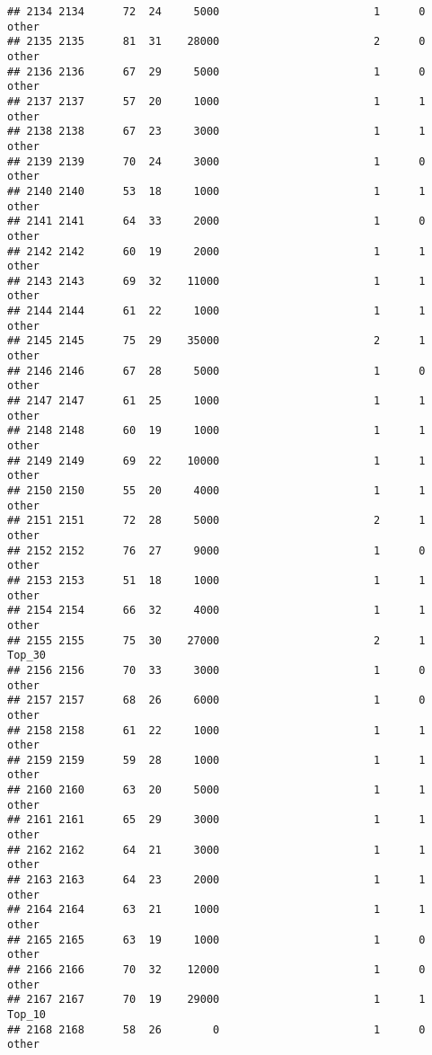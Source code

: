 \documentclass[
]{article}
\begin{document}
\begin{verbatim}
## 2134 2134      72  24     5000                        1      0    other
## 2135 2135      81  31    28000                        2      0    other
## 2136 2136      67  29     5000                        1      0    other
## 2137 2137      57  20     1000                        1      1    other
## 2138 2138      67  23     3000                        1      1    other
## 2139 2139      70  24     3000                        1      0    other
## 2140 2140      53  18     1000                        1      1    other
## 2141 2141      64  33     2000                        1      0    other
## 2142 2142      60  19     2000                        1      1    other
## 2143 2143      69  32    11000                        1      1    other
## 2144 2144      61  22     1000                        1      1    other
## 2145 2145      75  29    35000                        2      1    other
## 2146 2146      67  28     5000                        1      0    other
## 2147 2147      61  25     1000                        1      1    other
## 2148 2148      60  19     1000                        1      1    other
## 2149 2149      69  22    10000                        1      1    other
## 2150 2150      55  20     4000                        1      1    other
## 2151 2151      72  28     5000                        2      1    other
## 2152 2152      76  27     9000                        1      0    other
## 2153 2153      51  18     1000                        1      1    other
## 2154 2154      66  32     4000                        1      1    other
## 2155 2155      75  30    27000                        2      1   Top_30
## 2156 2156      70  33     3000                        1      0    other
## 2157 2157      68  26     6000                        1      0    other
## 2158 2158      61  22     1000                        1      1    other
## 2159 2159      59  28     1000                        1      1    other
## 2160 2160      63  20     5000                        1      1    other
## 2161 2161      65  29     3000                        1      1    other
## 2162 2162      64  21     3000                        1      1    other
## 2163 2163      64  23     2000                        1      1    other
## 2164 2164      63  21     1000                        1      1    other
## 2165 2165      63  19     1000                        1      0    other
## 2166 2166      70  32    12000                        1      0    other
## 2167 2167      70  19    29000                        1      1   Top_10
## 2168 2168      58  26        0                        1      0    other

\end{verbatim}
\end{document}
